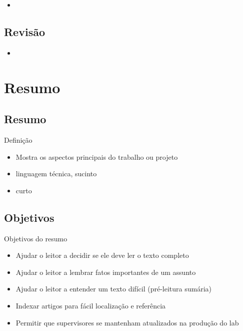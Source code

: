 \documentclass{beamer}
\begin{document}
\begin{frame}{}
  \begin{itemize}
  \item 
  \end{itemize}
\end{frame}

\subsection{Revisão}

\begin{frame}{}
  \begin{itemize}
  \item 
  \end{itemize}
\end{frame}

\section{Resumo}

\subsection{Resumo}

\begin{frame}{Definição}
  \begin{itemize}
  \item Mostra os aspectos principais do trabalho ou projeto
  \item linguagem técnica, sucinto
  \item curto
  \end{itemize}
\end{frame}

\subsection{Objetivos}

\begin{frame}{Objetivos do resumo}
  \begin{itemize}
  \item Ajudar o leitor a decidir se ele deve ler o texto completo


  \item Ajudar o leitor a lembrar fatos importantes de um assunto


  \item Ajudar o leitor a entender um texto difícil (pré-leitura
    sumária)

  \item Indexar artigos para fácil localização e referência

  \item Permitir que supervisores se mantenham atualizados na produção
    do lab
  \end{itemize}
\end{frame}
\end{document}
